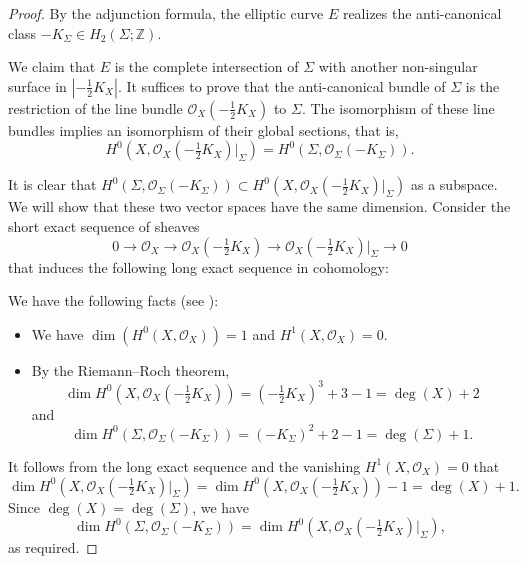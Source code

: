 \documentclass[10pt,a4paper]{article}
\numberwithin{equation}{section}
\theoremstyle{definition}
\theoremstyle{plain}
\theoremstyle{remark}
\begin{document}
\begin{proof}
By the adjunction formula, the elliptic curve $E$ realizes the anti-canonical class $-K_\Sigma \in H_2(\Sigma; \mathbb{Z})$.

We claim that $E$ is the complete intersection of $\Sigma$ with another non-singular surface in $|-\frac{1}{2}K_X|$. It suffices 
to prove that the anti-canonical bundle of $\Sigma$ is the restriction of the line bundle $\mathcal{O}_X(-\frac{1}{2}K_X)$ to $\Sigma$. The isomorphism of these line bundles implies an isomorphism of their global sections, that is,
 $$H^0\left(X,\mathcal{O}_X\left(-\tfrac{1}{2}K_X\right)|_\Sigma\right)=H^0\left(\Sigma,\mathcal{O}_\Sigma\left(-K_\Sigma\right)\right).$$
 
It is clear that $H^0(\Sigma,\mathcal{O}_\Sigma(-K_\Sigma)) \subset H^0(X,\mathcal{O}_X(-\frac{1}{2}K_X)|_\Sigma)$ as a subspace. We will show that these two vector spaces have the same dimension.
 Consider the short exact sequence of sheaves
 $$0\longrightarrow \mathcal{O}_X\longrightarrow \mathcal{O}_X\left(-\tfrac{1}{2}K_X\right)\longrightarrow \mathcal{O}_X\left(-\tfrac{1}{2}K_X\right)|_\Sigma \longrightarrow 0$$
 that induces the following long exact sequence in cohomology:

 \begin{center}
\end{center}

We have the following facts (see \cite[Section~3.2]{iskovskikh2010algebraic}): 
\begin{itemize}
\item We have $\dim (H^0(X,\mathcal{O}_X))=1$ and $H^1(X,\mathcal{O}_X)=0$.
\item By the Riemann--Roch theorem,
 $$\dim H^0\left(X, \mathcal{O}_X\left(-\tfrac{1}{2}K_X\right)\right)=\left(-\tfrac{1}{2}K_X\right)^3+3-1=\deg (X) +2$$ 
 and 
 $$\dim H^0\left(\Sigma,\mathcal{O}_\Sigma\left(-K_\Sigma\right)\right)=\left(-K_\Sigma\right)^2+2-1=\deg (\Sigma) +1.$$ 
\end{itemize}
It follows from the long exact sequence and the vanishing $H^1(X, \mathcal{O}_X) = 0$ that
 $$\dim H^0\left(X, \mathcal{O}_X\left(-\tfrac{1}{2}K_X\right)|_\Sigma\right)=\dim H^0\left(X, \mathcal{O}_X\left(-\tfrac{1}{2}K_X\right)\right)-1=\deg (X)+1.$$
Since $\deg(X) = \deg(\Sigma)$, we have 
$$\dim H^0(\Sigma,\mathcal{O}_\Sigma(-K_\Sigma))=\dim  H^0\left(X,\mathcal{O}_X\left(-\tfrac{1}{2}K_X\right)|_\Sigma\right),$$
as required.
  \end{proof}
\end{document}
